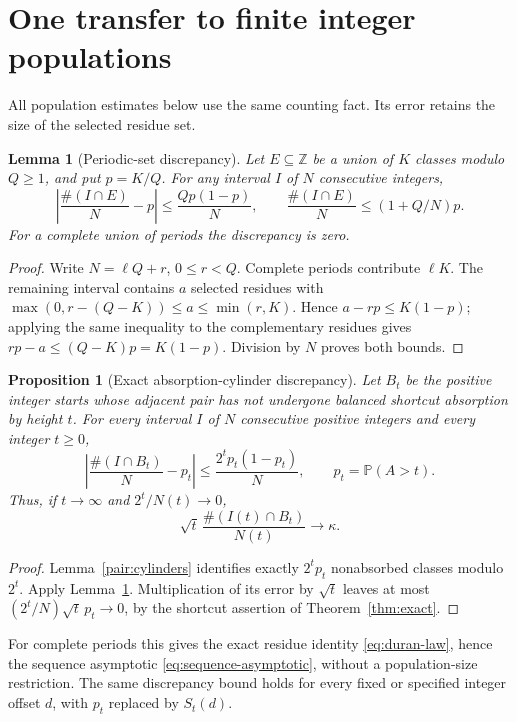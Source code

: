 \documentclass[11pt]{amsart}
\newtheorem{proposition}[theorem]{Proposition}
\newtheorem{lemma}[theorem]{Lemma}
\theoremstyle{definition}
\theoremstyle{remark}
\newcommand{\Z}{\mathbb Z}
\newcommand{\PP}{\mathbb P}
\begin{document}
\section{One transfer to finite integer populations}\label{sec:population}

All population estimates below use the same counting fact. Its error
retains the size of the selected residue set.

\begin{lemma}[Periodic-set discrepancy]\label{pop:periodic}
Let $E\subseteq\Z$ be a union of $K$ classes modulo $Q\ge1$, and put
$p=K/Q$. For any interval $I$ of $N$ consecutive integers,
\[
 \left|\frac{\#(I\cap E)}N-p\right|\le\frac{Qp(1-p)}N,
 \qquad
 \frac{\#(I\cap E)}N\le(1+Q/N)p.
\]
For a complete union of periods the discrepancy is zero.
\end{lemma}
\begin{proof}
Write $N=\ell Q+r$, $0\le r<Q$. Complete periods contribute $\ell K$.
The remaining interval contains $a$ selected residues with
$\max(0,r-(Q-K))\le a\le\min(r,K)$. Hence
$a-rp\le K(1-p)$; applying the same inequality to the complementary
residues gives $rp-a\le(Q-K)p=K(1-p)$. Division by $N$ proves both bounds.
\end{proof}

\begin{proposition}[Exact absorption-cylinder discrepancy]\label{pop:discrepancy}
Let $B_t$ be the positive integer starts whose adjacent pair has not
undergone balanced shortcut absorption by height $t$. For every interval
$I$ of $N$ consecutive positive integers and every integer $t\ge0$,
\begin{equation}\label{eq:population-error}
 \left|\frac{\#(I\cap B_t)}N-p_t\right|
 \le\frac{2^tp_t(1-p_t)}N,\qquad p_t=\PP(A>t).
\end{equation}
Thus, if $t\to\infty$ and $2^t/N(t)\to0$,
\[
 \sqrt t\,\frac{\#(I(t)\cap B_t)}{N(t)}\longrightarrow\kappa.
\]
\end{proposition}
\begin{proof}
Lemma~\ref{pair:cylinders} identifies exactly $2^tp_t$ nonabsorbed
classes modulo $2^t$. Apply Lemma~\ref{pop:periodic}. Multiplication of
its error by $\sqrt t$ leaves at most
$(2^t/N)\sqrt t\,p_t\to0$, by the shortcut assertion of
Theorem~\ref{thm:exact}.
\end{proof}
For complete periods this gives the exact residue identity
\eqref{eq:duran-law}, hence the sequence asymptotic
\eqref{eq:sequence-asymptotic}, without a population-size restriction.
The same discrepancy bound holds for every fixed or specified integer
offset $d$, with $p_t$ replaced by $S_t(d)$.
\end{document}
